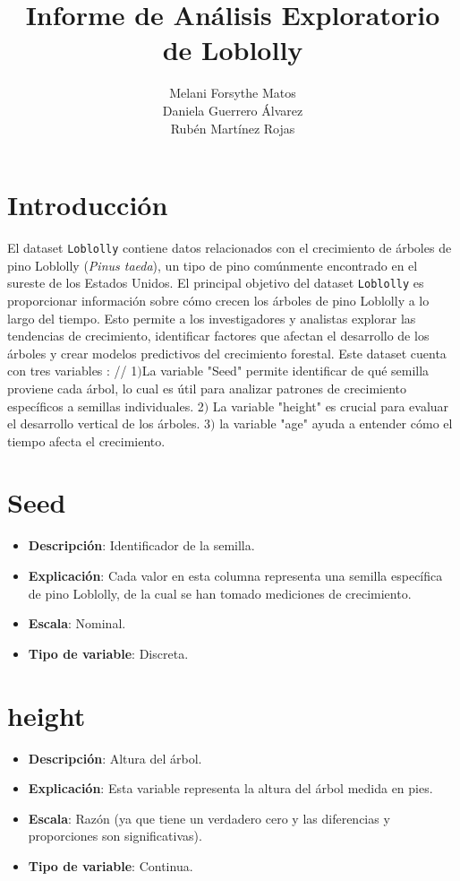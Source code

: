 \documentclass{article}
\title{Informe de Análisis Exploratorio de Loblolly}
\author{
  Melani Forsythe Matos \\
  Daniela Guerrero Álvarez \\
  Rubén Martínez Rojas
}
\date{} %
\begin{document}
\maketitle

\section*{Introducción}

El dataset \texttt{Loblolly} contiene datos relacionados con el crecimiento de árboles de pino Loblolly (\textit{Pinus taeda}), un tipo de pino comúnmente encontrado en el sureste de los Estados Unidos. El principal objetivo del dataset \texttt{Loblolly} es proporcionar información sobre cómo crecen los árboles de pino Loblolly a lo largo del tiempo. Esto permite a los investigadores y analistas explorar las tendencias de crecimiento, identificar factores que afectan el desarrollo de los árboles y crear modelos predictivos del crecimiento forestal.
Este dataset cuenta con tres variables :
//
1$)$La variable "Seed" permite identificar de qué semilla proviene cada árbol, lo cual es útil para analizar patrones de crecimiento específicos a semillas individuales.
2$)$ La variable "height" es crucial para evaluar el desarrollo vertical de los árboles.
3$)$ la variable "age" ayuda a entender cómo el tiempo afecta el crecimiento.

\section*{Seed}

\begin{itemize}
    \item \textbf{Descripción}: Identificador de la semilla.
    \item \textbf{Explicación}: Cada valor en esta columna representa una semilla específica de pino Loblolly, de la cual se han tomado mediciones de crecimiento.
    \item \textbf{Escala}: Nominal.
    \item \textbf{Tipo de variable}: Discreta.
\end{itemize}

\section*{height}

\begin{itemize}
    \item \textbf{Descripción}: Altura del árbol.
    \item \textbf{Explicación}: Esta variable representa la altura del árbol medida en pies.
    \item \textbf{Escala}: Razón (ya que tiene un verdadero cero y las diferencias y proporciones son significativas).
    \item \textbf{Tipo de variable}: Continua.
\end{itemize}
\end{document}
